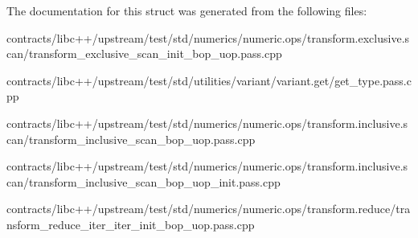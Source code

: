 The documentation for this struct was generated from the following files\+:\begin{DoxyCompactItemize}
\item 
contracts/libc++/upstream/test/std/numerics/numeric.\+ops/transform.\+exclusive.\+scan/transform\+\_\+exclusive\+\_\+scan\+\_\+init\+\_\+bop\+\_\+uop.\+pass.\+cpp\item 
contracts/libc++/upstream/test/std/utilities/variant/variant.\+get/get\+\_\+type.\+pass.\+cpp\item 
contracts/libc++/upstream/test/std/numerics/numeric.\+ops/transform.\+inclusive.\+scan/transform\+\_\+inclusive\+\_\+scan\+\_\+bop\+\_\+uop.\+pass.\+cpp\item 
contracts/libc++/upstream/test/std/numerics/numeric.\+ops/transform.\+inclusive.\+scan/transform\+\_\+inclusive\+\_\+scan\+\_\+bop\+\_\+uop\+\_\+init.\+pass.\+cpp\item 
contracts/libc++/upstream/test/std/numerics/numeric.\+ops/transform.\+reduce/transform\+\_\+reduce\+\_\+iter\+\_\+iter\+\_\+init\+\_\+bop\+\_\+uop.\+pass.\+cpp\end{DoxyCompactItemize}
